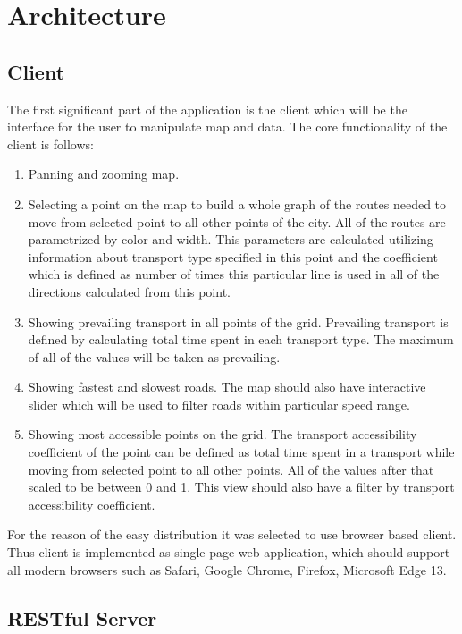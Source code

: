 
\section{ Architecture }
\subsection{ Client }

The first significant part of the application is the client which will
be the interface for the user to manipulate map and data. The core functionality of the client
is follows:

\begin{enumerate}
  \item Panning and zooming map.
  \item Selecting a point on the map to build a whole graph of
  the routes needed to move from selected point to all other points of the city. All of the routes
  are parametrized by color and width. This parameters are calculated utilizing information
  about transport type specified in this point and the coefficient which is defined as number of
  times this particular line is used in all of the directions calculated from this point.
  \item Showing prevailing transport in all points of the grid. Prevailing transport is defined
  by calculating total time spent in each transport type. The maximum of all of the values will
  be taken as prevailing.
  \item Showing fastest and slowest roads. The map should also have interactive slider
  which will be used to filter roads within particular speed range.
  \item Showing most accessible points on the grid. The transport accessibility coefficient of the
  point can be defined as total time spent in a transport while moving from selected point to all
  other points. All of the values after that scaled to be between 0 and 1. This view should also
  have a filter by transport accessibility coefficient.
\end{enumerate}

For the reason of the easy distribution it was selected to use browser based client. Thus
client is implemented as single-page web application, which should support all modern browsers such
as Safari, Google Chrome, Firefox, Microsoft Edge 13.

\subsection{ RESTful Server }

